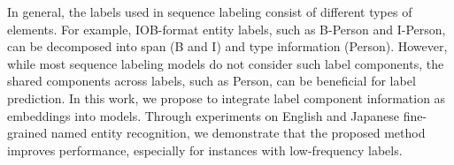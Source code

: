 In general, the labels used in sequence labeling consist of different types of elements. For example, IOB-format entity labels, such as B-Person and I-Person, can be decomposed into span (B and I) and type information (Person). However, while most sequence labeling models do not consider such label components, the shared components across labels, such as Person, can be beneficial for label prediction. In this work, we propose to integrate label component information as embeddings into models. Through experiments on English and Japanese fine-grained named entity recognition, we demonstrate that the proposed method improves performance, especially for instances with low-frequency labels.

